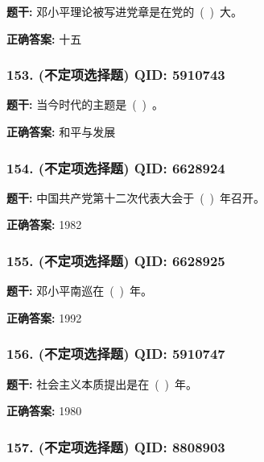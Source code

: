 \documentclass[12pt,UTF8]{ctexart}
\begin{document}
\textbf{题干:}
邓小平理论被写进党章是在党的 ( ) 大。

\textbf{正确答案:}
十五

\vspace{0.3em}\hrulefill\vspace{0.7em}

\subsubsection*{153. (不定项选择题) \small QID: 5910743}

\textbf{题干:}
当今时代的主题是 ( ) 。

\textbf{正确答案:}
和平与发展

\vspace{0.3em}\hrulefill\vspace{0.7em}

\subsubsection*{154. (不定项选择题) \small QID: 6628924}

\textbf{题干:}
中国共产党第十二次代表大会于 ( ) 年召开。

\textbf{正确答案:}
1982

\vspace{0.3em}\hrulefill\vspace{0.7em}

\subsubsection*{155. (不定项选择题) \small QID: 6628925}

\textbf{题干:}
邓小平南巡在 ( ) 年。

\textbf{正确答案:}
1992

\vspace{0.3em}\hrulefill\vspace{0.7em}

\subsubsection*{156. (不定项选择题) \small QID: 5910747}

\textbf{题干:}
社会主义本质提出是在 ( ) 年。

\textbf{正确答案:}
1980

\vspace{0.3em}\hrulefill\vspace{0.7em}

\subsubsection*{157. (不定项选择题) \small QID: 8808903}
\end{document}
